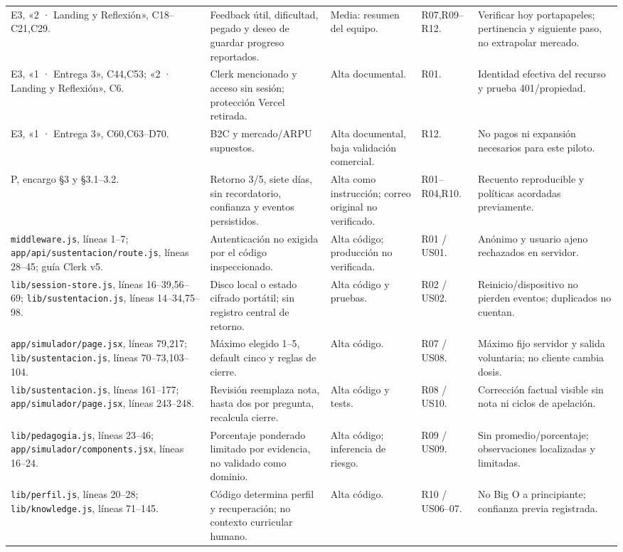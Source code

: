 \documentclass[11pt,a4paper]{report}
\newcommand{\src}[2]{\nolinkurl{#1}, líneas #2}
\begin{document}
\begin{landscape}
\begin{longtable}{P{6cm}P{6cm}P{3cm}P{4cm}P{4.4cm}}
E3, «2 · Landing y Reflexión», C18--C21,C29. & Feedback útil, dificultad, pegado y deseo de guardar progreso reportados. & Media: resumen del equipo. & R07,R09--R12. & Verificar hoy portapapeles; pertinencia y siguiente paso, no extrapolar mercado.\\
E3, «1 · Entrega 3», C44,C53; «2 · Landing y Reflexión», C6. & Clerk mencionado y acceso sin sesión; protección Vercel retirada. & Alta documental. & R01. & Identidad efectiva del recurso y prueba 401/propiedad.\\
E3, «1 · Entrega 3», C60,C63--D70. & B2C y mercado/ARPU supuestos. & Alta documental, baja validación comercial. & R12. & No pagos ni expansión necesarios para este piloto.\\
P, encargo §3 y §3.1--3.2. & Retorno 3/5, siete días, sin recordatorio, confianza y eventos persistidos. & Alta como instrucción; correo original no verificado. & R01--R04,R10. & Recuento reproducible y políticas acordadas previamente.\\
\src{middleware.js}{1--7}; \src{app/api/sustentacion/route.js}{28--45}; guía Clerk v5. & Autenticación no exigida por el código inspeccionado. & Alta código; producción no verificada. & R01 / US01. & Anónimo y usuario ajeno rechazados en servidor.\\
\src{lib/session-store.js}{16--39,56--69}; \src{lib/sustentacion.js}{14--34,75--98}. & Disco local o estado cifrado portátil; sin registro central de retorno. & Alta código y pruebas. & R02 / US02. & Reinicio/dispositivo no pierden eventos; duplicados no cuentan.\\
\src{app/simulador/page.jsx}{79,217}; \src{lib/sustentacion.js}{70--73,103--104}. & Máximo elegido 1--5, default cinco y reglas de cierre. & Alta código. & R07 / US08. & Máximo fijo servidor y salida voluntaria; no cliente cambia dosis.\\
\src{lib/sustentacion.js}{161--177}; \src{app/simulador/page.jsx}{243--248}. & Revisión reemplaza nota, hasta dos por pregunta, recalcula cierre. & Alta código y tests. & R08 / US10. & Corrección factual visible sin nota ni ciclos de apelación.\\
\src{lib/pedagogia.js}{23--46}; \src{app/simulador/components.jsx}{16--24}. & Porcentaje ponderado limitado por evidencia, no validado como dominio. & Alta código; inferencia de riesgo. & R09 / US09. & Sin promedio/porcentaje; observaciones localizadas y limitadas.\\
\src{lib/perfil.js}{20--28}; \src{lib/knowledge.js}{71--145}. & Código determina perfil y recuperación; no contexto curricular humano. & Alta código. & R10 / US06--07. & No Big O a principiante; confianza previa registrada.\\

\end{longtable}
\end{landscape}
\end{document}
